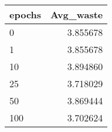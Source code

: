 \begin{tabular}{lr}
\toprule
epochs &  Avg\_waste \\
\midrule
     0 &   3.855678 \\
     1 &   3.855678 \\
    10 &   3.894860 \\
    25 &   3.718029 \\
    50 &   3.869444 \\
   100 &   3.702624 \\
\bottomrule
\end{tabular}
